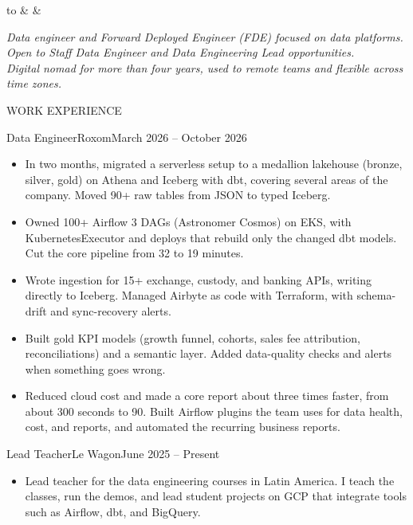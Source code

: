 \documentclass{mcdowellcv}
\renewcommand\makeheader{%
  \noindent\begin{tabu} to \dimexpr\textwidth-2\tabcolsep\relax { X[l,m] X[2,c,m] X[r,m] }
    \printaddress & \printname & \printcontacts \\
  \end{tabu}\par
}
\begin{document}
\makeheader

\vspace{1pt}
{\centering\footnotesize\itshape Data engineer and Forward Deployed Engineer (FDE) focused on data platforms.\\
Open to Staff Data Engineer and Data Engineering Lead opportunities.\\
Digital nomad for more than four years, used to remote teams and flexible across time zones.\par}
\vspace{-12pt}

\begin{cvsection}{WORK EXPERIENCE}

	\begin{cvsubsection}{Data Engineer}{Roxom}{March 2026 -- October 2026}
		\begin{itemize}
			\item In two months, migrated a serverless setup to a medallion lakehouse (bronze, silver, gold) on Athena and Iceberg with dbt, covering several areas of the company. Moved 90+ raw tables from JSON to typed Iceberg.
			\item Owned 100+ Airflow 3 DAGs (Astronomer Cosmos) on EKS, with KubernetesExecutor and deploys that rebuild only the changed dbt models. Cut the core pipeline from 32 to 19 minutes.
			\item Wrote ingestion for 15+ exchange, custody, and banking APIs, writing directly to Iceberg. Managed Airbyte as code with Terraform, with schema-drift and sync-recovery alerts.
			\item Built gold KPI models (growth funnel, cohorts, sales fee attribution, reconciliations) and a semantic layer. Added data-quality checks and alerts when something goes wrong.
			\item Reduced cloud cost and made a core report about three times faster, from about 300 seconds to 90. Built Airflow plugins the team uses for data health, cost, and reports, and automated the recurring business reports.
		\end{itemize}
	\end{cvsubsection}

	\begin{cvsubsection}{Lead Teacher}{Le Wagon}{June 2025 -- Present}
		\begin{itemize}
			\item Lead teacher for the data engineering courses in Latin America. I teach the classes, run the demos, and lead student projects on GCP that integrate tools such as Airflow, dbt, and BigQuery.
		\end{itemize}
	\end{cvsubsection}


\end{cvsection}
\end{document}
